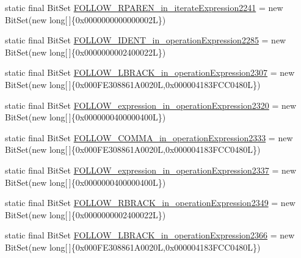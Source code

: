 \begin{DoxyCompactItemize}
\item 
static final Bit\-Set \hyperlink{classorg_1_1tzi_1_1use_1_1parser_1_1testsuite_1_1_test_suite_parser_a8e3d9faecbc22f008e6fefa3d11f5614}{F\-O\-L\-L\-O\-W\-\_\-\-R\-P\-A\-R\-E\-N\-\_\-in\-\_\-iterate\-Expression2241} = new Bit\-Set(new long\mbox{[}$\,$\mbox{]}\{0x0000000000000002\-L\})
\item 
static final Bit\-Set \hyperlink{classorg_1_1tzi_1_1use_1_1parser_1_1testsuite_1_1_test_suite_parser_a606ab7a6cb86681759e54e974748f29c}{F\-O\-L\-L\-O\-W\-\_\-\-I\-D\-E\-N\-T\-\_\-in\-\_\-operation\-Expression2285} = new Bit\-Set(new long\mbox{[}$\,$\mbox{]}\{0x0000000002400022\-L\})
\item 
static final Bit\-Set \hyperlink{classorg_1_1tzi_1_1use_1_1parser_1_1testsuite_1_1_test_suite_parser_a6a1d54f787792dd4796c6cf85e892d32}{F\-O\-L\-L\-O\-W\-\_\-\-L\-B\-R\-A\-C\-K\-\_\-in\-\_\-operation\-Expression2307} = new Bit\-Set(new long\mbox{[}$\,$\mbox{]}\{0x000\-F\-E308861\-A0020\-L,0x000004183\-F\-C\-C0480\-L\})
\item 
static final Bit\-Set \hyperlink{classorg_1_1tzi_1_1use_1_1parser_1_1testsuite_1_1_test_suite_parser_a5836d1a46a0297c2103cae7bf90070b6}{F\-O\-L\-L\-O\-W\-\_\-expression\-\_\-in\-\_\-operation\-Expression2320} = new Bit\-Set(new long\mbox{[}$\,$\mbox{]}\{0x0000000400000400\-L\})
\item 
static final Bit\-Set \hyperlink{classorg_1_1tzi_1_1use_1_1parser_1_1testsuite_1_1_test_suite_parser_a1f7348f7475bad1914608589edd63090}{F\-O\-L\-L\-O\-W\-\_\-\-C\-O\-M\-M\-A\-\_\-in\-\_\-operation\-Expression2333} = new Bit\-Set(new long\mbox{[}$\,$\mbox{]}\{0x000\-F\-E308861\-A0020\-L,0x000004183\-F\-C\-C0480\-L\})
\item 
static final Bit\-Set \hyperlink{classorg_1_1tzi_1_1use_1_1parser_1_1testsuite_1_1_test_suite_parser_a16ec514406abe39fc0321728027b2dd9}{F\-O\-L\-L\-O\-W\-\_\-expression\-\_\-in\-\_\-operation\-Expression2337} = new Bit\-Set(new long\mbox{[}$\,$\mbox{]}\{0x0000000400000400\-L\})
\item 
static final Bit\-Set \hyperlink{classorg_1_1tzi_1_1use_1_1parser_1_1testsuite_1_1_test_suite_parser_a6836f3495e693616b879d87bbce89fdb}{F\-O\-L\-L\-O\-W\-\_\-\-R\-B\-R\-A\-C\-K\-\_\-in\-\_\-operation\-Expression2349} = new Bit\-Set(new long\mbox{[}$\,$\mbox{]}\{0x0000000002400022\-L\})
\item 
static final Bit\-Set \hyperlink{classorg_1_1tzi_1_1use_1_1parser_1_1testsuite_1_1_test_suite_parser_a1ffdae9679f25059666c6cfbd633e424}{F\-O\-L\-L\-O\-W\-\_\-\-L\-B\-R\-A\-C\-K\-\_\-in\-\_\-operation\-Expression2366} = new Bit\-Set(new long\mbox{[}$\,$\mbox{]}\{0x000\-F\-E308861\-A0020\-L,0x000004183\-F\-C\-C0480\-L\})

\end{DoxyCompactItemize}
